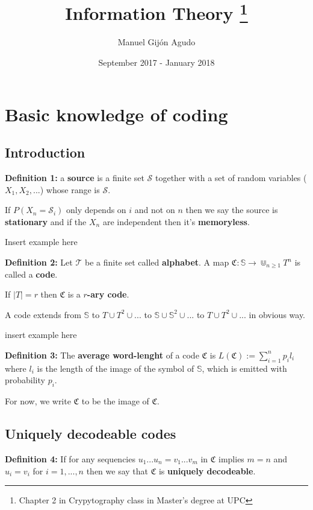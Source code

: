 \documentclass{article}
\title{Information Theory \thanks{Chapter 2 in Crypytography class in Master's degree at UPC}}
\author{Manuel Gijón Agudo }
\date{September 2017 - January 2018}
\begin{document}
	\begin{titlepage}
		\maketitle{} 
	\end{titlepage}
	
	\newpage
	\tableofcontents
	\newpage
					
					
		\section{Basic knowledge of coding}

		\subsection{Introduction}
\noindent\textbf{Definition 	1:}  a \textbf{source} is a finite set $\mathcal{S}$ together with a set of random variables ($X_1, X_2, ...$) whose range is $\mathcal{S}$.

If $P(X_n = \mathcal{S}_i)$ only depends on $i$ and not on $n$ then we say the source is \textbf{stationary} and if the $X_n$ are independent then it's \textbf{memoryless}.

Insert example here

\noindent\textbf{Definition 	2:} Let $\mathcal{T}$ be a finite set called \textbf{alphabet}. A map $\mathfrak{C}: \mathbb{S} \longrightarrow \Cup_{n \geq 1} T^{n}$ is called a \textbf{code}.

If $|T| = r$ then $\mathfrak{C}$ is a \textbf{$r$-ary code}. 

\noindent A code extends from $\mathbb{S}$ to $T \cup T^2 \cup ...$ to $\mathbb{S} \cup \mathbb{S}^2 \cup ...$  to $T \cup T^2 \cup ...$ in obvious way.

insert example here


\noindent\textbf{Definition 	3:} The \textbf{average word-lenght} of a code $\mathfrak{C}$ is $L(\mathfrak{C}) := \sum_{i = 1}^{n} p_i l_i$ where $l_i$ is the length of the image of the symbol of $\mathbb{S}$, which is emitted with probability $p_i$.

\noindent For now, we write $\mathfrak{C}$ to be the image of $\mathfrak{C}$. 

		\subsection{Uniquely decodeable codes}
	
\noindent\textbf{Definition 	4:}  If for any sequencies $u_1 ... u_n = v_1 ... v_m$ in $\mathfrak{C}$ implies $m = n$ and $u_i = v_i$ for $i = 1, ..., n$ then we say that $\mathfrak{C}$ is \textbf{uniquely decodeable}.
\end{document}
